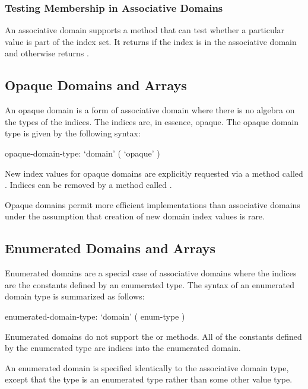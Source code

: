 \subsubsection{Testing Membership in Associative Domains}

An associative domain supports a  method that can test
whether a particular value is part of the index set. It
returns  if the index is in the associative domain and
otherwise returns .

\subsection{Opaque Domains and Arrays}
\label{Opaque_Domains_and_Arrays}

An opaque domain is a form of associative domain where there is no
algebra on the types of the indices.  The indices are, in essence,
opaque.  The opaque domain type is given by the following syntax:
\begin{syntax}
opaque-domain-type:
  `domain' ( `opaque' )
\end{syntax}

New index values for opaque domains are explicitly requested via a
method called .  Indices can be removed by a method
called .

Opaque domains permit more efficient implementations than associative
domains under the assumption that creation of new domain index values
is rare.

\subsection{Enumerated Domains and Arrays}
\label{Enumerated_Domains_and_Arrays}

Enumerated domains are a special case of associative domains where the
indices are the constants defined by an enumerated type.  The syntax
of an enumerated domain type is summarized as follows:
\begin{syntax}
enumerated-domain-type:
  `domain' ( enum-type )
\end{syntax}

Enumerated domains do not support the  or 
methods.  All of the constants defined by the enumerated type are
indices into the enumerated domain.

An enumerated domain is specified identically to the associative
domain type, except that the type is an enumerated type rather than
some other value type.

